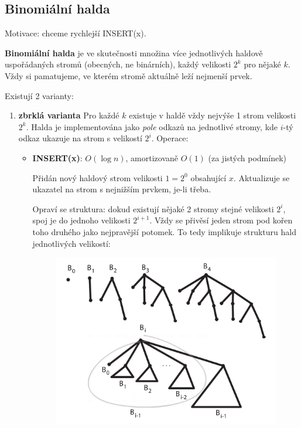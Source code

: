 \documentclass[11pt]{report} %
\numberwithin{equation}{section}
\begin{document}
\subsection{Binomiální halda}
Motivace: chceme rychlejší INSERT(x).

\textbf{Binomiální halda} je ve skutečnosti množina více jednotlivých haldově uspořádaných stromů (obecných, ne binárních), každý velikosti $2^k$ pro nějaké $k$. Vždy si pamatujeme, ve kterém stromě aktuálně leží nejmenší prvek.

Existují 2 varianty:
\begin{enumerate}
	
	
	\item \textbf{zbrklá varianta} Pro každé $k$ existuje v haldě vždy nejvýše 1 strom velikosti $2^k$. Halda je implementována jako \textit{pole} odkazů na jednotlivé stromy, kde $i$-tý odkaz ukazuje na strom s velikostí $2^i$.
	Operace:
	\begin{itemize}
		
		
		\item \textbf{INSERT(x)}: $O(\log n)$, amortizovaně $O(1)$ (za jistých podmínek)
		
		Přidán nový haldový strom velikosti $1 = 2^0$ obsahující $x$. Aktualizuje se ukazatel na strom s nejnižším prvkem, je-li třeba.
		
		Opraví se struktura: dokud existují nějaké 2 stromy stejné velikosti $2^i$, spoj je do jednoho velikosti $2^{i+1}$. Vždy se přivěsí jeden strom pod kořen toho druhého jako nejpravější potomek. To tedy implikuje strukturu hald jednotlivých velikostí:
		\begin{figure}[H]
			\centering		
			\includegraphics[scale=0.7]{img/binomial_heaps.png}
		\end{figure}


\end{itemize}
\end{enumerate}
\end{document}
